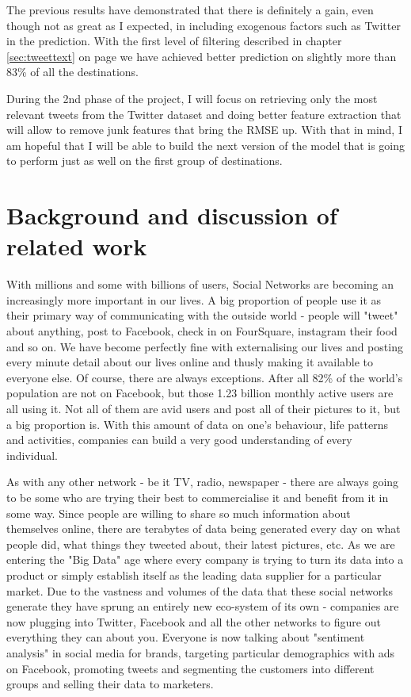 \documentclass[minf,frontabs,twoside,singlespacing,parskip]{infthesis}
\begin{document}
The previous results have demonstrated that there is definitely a gain, even though not as great as I expected, in including exogenous factors such as Twitter in the prediction. With the first level of filtering described in chapter \ref{sec:tweettext} on page \pageref{sec:tweettext} we have achieved better prediction on slightly more than 83\% of all the destinations.  


During the 2nd phase of the project, I will focus on retrieving only the most relevant tweets from the Twitter dataset and doing better feature extraction that will allow to remove junk features that bring the RMSE up. With that in mind, I am hopeful that I will be able to build the next version of the model that is going to perform just as well on the first group of destinations. 



\chapter{Background and discussion of related work}


With millions and some with billions of users, Social Networks are becoming an increasingly more important in our lives. A big proportion of people use it as their primary way of communicating with the outside world - people will "tweet" about anything, post to Facebook, check in on FourSquare, instagram their food and so on. We have become perfectly fine with externalising our lives and posting every minute detail about our lives online and thusly making it available to everyone else. 
Of course, there are always exceptions. After all 82\% of the world's population are not on Facebook, but those 1.23 billion monthly active users are all using it. Not all of them are avid users and post all of their pictures to it, but a big proportion is. With this amount of data on one's behaviour, life patterns and activities, companies can build a very good understanding of every individual. 


As with any other network - be it TV, radio, newspaper - there are always going to be some who are trying their best to commercialise it and benefit from it in some way. Since people are willing to share so much information about themselves online, there are terabytes of data being generated every day on what people did, what things they tweeted about, their latest pictures, etc. As we are entering the "Big Data" age where every company is trying to turn its data into a product or simply establish itself as the leading data supplier for a particular market. Due to the vastness and volumes of the data that these social networks generate they have sprung an entirely new eco-system of its own - companies are now plugging into Twitter, Facebook and all the other networks to figure out everything they can about you. Everyone is now talking about "sentiment analysis" in social media for brands, targeting particular demographics with ads on Facebook, promoting tweets and segmenting the customers into different groups and selling their data to marketers.
\end{document}
